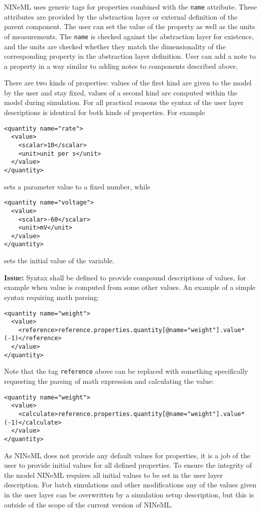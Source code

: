 \documentclass{article}
\newcommand{\issue}[1]{%
\begin{center}
\colorbox{issuecolor}{\parbox{0.8\linewidth}{\textbf{Issue:} #1}}
\end{center}%
}
\begin{document}
NINeML uses generic tags for properties combined with the {\tt name} attribute. These
attributes are provided by the abstraction layer or external definition of the parent
component. The user can set the value of the property as well as the units of
measurements. The {\tt name} is checked against the abstraction layer for existence,
and the units are checked whether they match the dimensionality of the corresponding
property in the abstraction layer definition. User can add a note to a property in a
way similar to adding notes to components described above.

There are two kinds of properties: values of the first kind are given to the
model by the user and stay fixed, values of a second kind are computed within
the model during simulation. For all practical reasons the syntax of the user
layer descriptions is identical for both kinds of properties. For example
\begin{verbatim}
<quantity name="rate">
  <value>
    <scalar>10</scalar>
    <unit>unit per s</unit>
  </value>
</quantity>
\end{verbatim}
sets a parameter value to a fixed number, while
\begin{verbatim}
<quantity name="voltage">
  <value>
    <scalar>-60</scalar>
    <unit>mV</unit>
  </value>
</quantity>
\end{verbatim}
sets the initial value of the variable.

\issue{Syntax shall be defined to provide compound descriptions of values, for
example when value is computed from some other values. An example of a simple
syntax requiring math parsing:}
\begin{verbatim}
<quantity name="weight">
  <value>
    <reference>reference.properties.quantity[@name="weight"].value*(-1)</reference>
  </value>
</quantity>
\end{verbatim}
Note that the tag {\tt reference} above can be replaced with something specifically
requesting the parsing of math expression and calculating the value:
\begin{verbatim}
<quantity name="weight">
  <value>
    <calculate>reference.properties.quantity[@name="weight"].value*(-1)</calculate>
  </value>
</quantity>
\end{verbatim}

As NINeML does not provide any default values for properties, it is a job of the
user to provide initial values for all defined properties. To ensure the integrity
of the model NINeML requires all initial values to be set in the user layer
description. For batch simulations and other modifications any of the values
given in the user layer can be overwritten by a simulation setup description,
but this is outside of the scope of the current version of NINeML.
\end{document}
